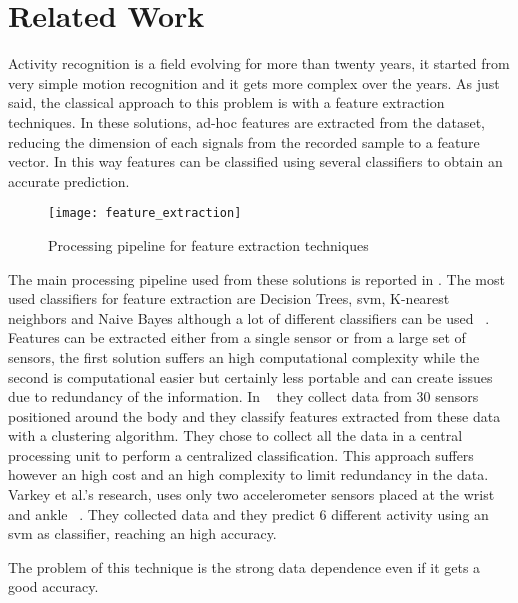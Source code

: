 
\section{Related Work}
\label{sec:related_work}

Activity recognition is a field evolving for more than twenty years, it started from very simple motion recognition and it gets more complex over the years.
As just said, the classical approach to this problem is with a feature extraction techniques.
In these solutions, ad-hoc features are extracted from the dataset, reducing the dimension of each signals from the recorded sample to a feature vector.
In this way features can be classified using several classifiers to obtain an accurate prediction.

\begin{figure}[!ht]
  \centering
  \texttt{[image: feature\_extraction]}
  \caption{Processing pipeline for feature extraction techniques}
  \label{fig:feature_extraction}
\end{figure}

The main processing pipeline used from these solutions is reported in .
The most used classifiers for feature extraction are Decision Trees, \gls{svm}, K-nearest neighbors and Naive Bayes although a lot of different classifiers can be used ~\cite{Ravi05}.
Features can be extracted either from a single sensor or from a large set of sensors, the first solution suffers an high computational complexity while the second is computational easier but certainly less  portable and can create issues due to redundancy of the information.
In ~\cite{Laerhoven02} they collect data from 30 sensors positioned around the body and they classify features extracted from these data with a clustering algorithm. They chose to collect all the data in a central processing unit to perform a centralized classification. This approach suffers however an high cost and an high complexity to limit redundancy in the data.
Varkey et al.'s research, uses only two accelerometer sensors placed at the wrist and ankle ~\cite{Varkey2012}. They collected data and they predict 6 different activity using an \gls{svm} as classifier, reaching an high accuracy.

The problem of this technique is the strong data dependence even if it gets a good accuracy.

